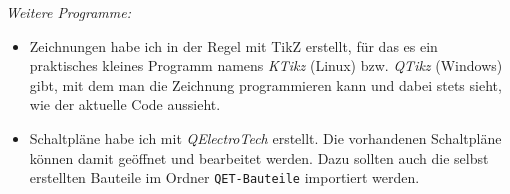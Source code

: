 \vspace{2\baselineskip}
\emph{Weitere Programme:}

\begin{itemize}
	\item Zeichnungen habe ich in der Regel mit TikZ erstellt, für das es ein praktisches kleines Programm namens \emph{KTikz} (Linux) bzw. \emph{QTikz} (Windows) gibt, mit dem man die Zeichnung programmieren kann und dabei stets sieht, wie der aktuelle Code aussieht.
	\item Schaltpläne habe ich mit \emph{QElectroTech} erstellt. Die vorhandenen Schaltpläne können damit geöffnet und bearbeitet werden. Dazu sollten auch die selbst erstellten Bauteile im Ordner \texttt{QET-Bauteile} importiert werden.
\end{itemize}








